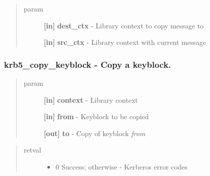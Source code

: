 \documentclass[letterpaper,10pt,english]{sphinxmanual}
\begin{document}
\begin{fulllineitems}
\label{appdev/refs/api/krb5_copy_error_message:c.krb5_copy_error_message}
\end{fulllineitems}

\begin{quote}\begin{description}
\item[{param}] \leavevmode
\textbf{{[}in{]}} \textbf{dest\_ctx} - Library context to copy message to

\textbf{{[}in{]}} \textbf{src\_ctx} - Library context with current message

\end{description}\end{quote}


\subsubsection{krb5\_copy\_keyblock -  Copy a keyblock.}
\label{appdev/refs/api/krb5_copy_keyblock:krb5-copy-keyblock-copy-a-keyblock}\label{appdev/refs/api/krb5_copy_keyblock::doc}

\begin{fulllineitems}
\label{appdev/refs/api/krb5_copy_keyblock:c.krb5_copy_keyblock}
\end{fulllineitems}

\begin{quote}\begin{description}
\item[{param}] \leavevmode
\textbf{{[}in{]}} \textbf{context} - Library context

\textbf{{[}in{]}} \textbf{from} - Keyblock to be copied

\textbf{{[}out{]}} \textbf{to} - Copy of keyblock \emph{from}

\end{description}\end{quote}
\begin{quote}\begin{description}
\item[{retval}] \leavevmode\begin{itemize}
\item {} 
0   Success; otherwise - Kerberos error codes

\end{itemize}

\end{description}\end{quote}
\end{document}
